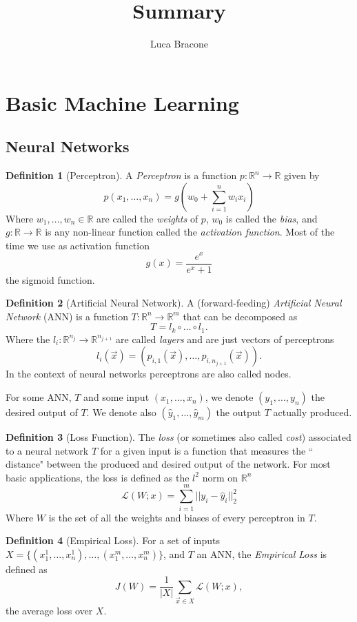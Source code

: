 \documentclass{article}
\title{Summary}
\author{Luca Bracone}
\newcommand{\R}{\mathbb{R}}
\theoremstyle{plain}
\theoremstyle{definition}
\newtheorem{definition}{Definition}[section]
\theoremstyle{remark}
\begin{document}
	\maketitle
	\tableofcontents
	\newpage
	


	
	\section{Basic Machine Learning}
	\subsection{Neural Networks}
	\begin{definition}[Perceptron]
		A \emph{Perceptron} is a function $ p:\R^n \to \R $ given by 
		\[ p(x_1, \dots , x_n) = g \left( w_0 + \sum_{i=1}^{n} w_i x_i \right)  \]
		Where $ w_1, \dots, w_n \in \R $ are called the \emph{weights} of $p$, $w_0$ is called the \emph{bias}, and $g:\R \to \R $ is any non-linear function called the \emph{activation function}.
		Most of the time we use as activation function \[ g(x)=\frac{e^x}{e^x+1} \] the sigmoid function.
	\end{definition}
	\begin{definition}[Artificial Neural Network]
		A (forward-feeding) \emph{Artificial Neural Network} (ANN) is a function $T: \R^n \to \R^m$ that can be decomposed as  \[ T= l_k \circ \dots \circ l_1  .\] Where the $l_i : \R^{n_j} \to \R^{n_{j+1}}$ are called \emph{layers} and are just vectors of perceptrons \[ l_i(\vec{x})=(p_{i,1}(\vec{x}),\dots,p_{i,n_{j+1}}(\vec{x})). \]
		In the context of neural networks perceptrons are also called nodes.
	\end{definition}
For some ANN, $T$ and some input $ (x_1,...,x_n) $, we denote $ (y_1,...,y_n) $ the desired output of $ T $. We denote also $ (\hat{y}_1,...,\hat{y}_m) $ the output $T$ actually produced.
\begin{definition}[Loss Function]
	 The \emph{loss} (or sometimes also called \emph{cost})  associated to a neural network $T$ for a given input is a function that measures the `` distance" between the produced and desired output of the network. For most basic applications, the loss is defined as the $l^2$ norm on $\R^n$
	\[\mathcal{L}(W; x)= \sum_{i=1}^{m} ||y_i - \hat{y}_i||_2^2  \]
	Where $W$ is the set of all the weights and biases of every perceptron in $T$.
\end{definition}
\begin{definition}[Empirical Loss]
	For a set of inputs $X=\{(x_1^1,\dots,x_n^1), \dots , (x_1^m,\dots ,x_n^m)\}$, and $T$ an ANN, the \emph{Empirical Loss} is defined as
	\[ J(W)=\frac{1}{|X|} \sum_{\vec{x}\in X} \mathcal{L}(W;x), \]
	the average loss over $X$.
\end{definition}
\end{document}
